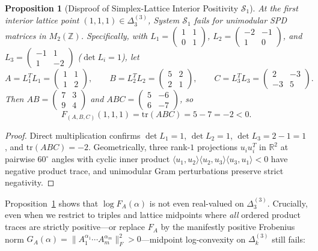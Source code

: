 \documentclass[11pt,a4paper]{article}
\newtheorem{proposition}[theorem]{Proposition}
\theoremstyle{definition}
\theoremstyle{remark}
\newcommand{\tr}{\mathrm{tr}}
\newcommand{\DeltaLat}{\Delta}
\begin{document}
\begin{proposition}[Disproof of Simplex-Lattice Interior Positivity $\mathcal{S}_1$]\label{prop:positivity}
At the first interior lattice point $(1, 1, 1) \in \DeltaLat_3^{(3)}$, System $\mathcal{S}_1$ fails for unimodular SPD matrices in $M_2(\mathbb{Z})$. Specifically, with $L_1 = \begin{pmatrix} 1 & 1 \\ 0 & 1 \end{pmatrix}$, $L_2 = \begin{pmatrix} -2 & -1 \\ 1 & 0 \end{pmatrix}$, and $L_3 = \begin{pmatrix} -1 & 1 \\ 1 & -2 \end{pmatrix}$ ($\det L_i = 1$), let
\[
A = L_1^T L_1 = \begin{pmatrix} 1 & 1 \\ 1 & 2 \end{pmatrix}, \qquad
B = L_2^T L_2 = \begin{pmatrix} 5 & 2 \\ 2 & 1 \end{pmatrix}, \qquad
C = L_3^T L_3 = \begin{pmatrix} 2 & -3 \\ -3 & 5 \end{pmatrix}.
\]
Then $AB = \begin{pmatrix} 7 & 3 \\ 9 & 4 \end{pmatrix}$ and $ABC = \begin{pmatrix} 5 & -6 \\ 6 & -7 \end{pmatrix}$, so
\[
F_{(A,B,C)}(1, 1, 1) = \tr(ABC) = 5 - 7 = -2 < 0.
\]
\end{proposition}
\begin{proof}
Direct multiplication confirms $\det L_1 = 1$, $\det L_2 = 1$, $\det L_3 = 2 - 1 = 1$, and $\tr(ABC) = -2$. Geometrically, three rank-$1$ projections $u_i u_i^T$ in $\mathbb{R}^2$ at pairwise $60^\circ$ angles with cyclic inner product $\langle u_1, u_2 \rangle \langle u_2, u_3 \rangle \langle u_3, u_1 \rangle < 0$ have negative product trace, and unimodular Gram perturbations preserve strict negativity.
\end{proof}

Proposition~\ref{prop:positivity} shows that $\log F_A(\alpha)$ is not even real-valued on $\DeltaLat_3^{(3)}$. Crucially, even when we restrict to triples and lattice midpoints where \emph{all} ordered product traces are strictly positive---or replace $F_A$ by the manifestly positive Frobenius norm $G_A(\alpha) = \|A_1^{\alpha_1}\cdots A_m^{\alpha_m}\|_F^2 > 0$---midpoint log-convexity on $\DeltaLat_k^{(3)}$ still fails:
\end{document}
